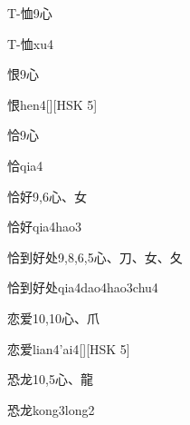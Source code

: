 \begin{entry}{T-恤}{9}{⼼}
  \begin{phonetics}{T-恤}{xu4}
  \end{phonetics}
\end{entry}

\begin{entry}{恨}{9}{⼼}
  \begin{phonetics}{恨}{hen4}[][HSK 5]
  \end{phonetics}
\end{entry}

\begin{entry}{恰}{9}{⼼}
  \begin{phonetics}{恰}{qia4}
  \end{phonetics}
\end{entry}

\begin{entry}{恰好}{9,6}{⼼、⼥}
  \begin{phonetics}{恰好}{qia4hao3}
  \end{phonetics}
\end{entry}

\begin{entry}{恰到好处}{9,8,6,5}{⼼、⼑、⼥、⼡}
  \begin{phonetics}{恰到好处}{qia4dao4hao3chu4}
  \end{phonetics}
\end{entry}

\begin{entry}{恋爱}{10,10}{⼼、⽖}
  \begin{phonetics}{恋爱}{lian4'ai4}[][HSK 5]
  \end{phonetics}
\end{entry}

\begin{entry}{恐龙}{10,5}{⼼、⿓}
  \begin{phonetics}{恐龙}{kong3long2}
  \end{phonetics}
\end{entry}

